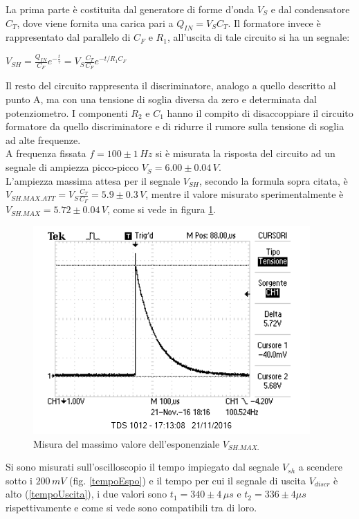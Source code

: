\documentclass[10pt,a4paper]{article}
\begin{document}
La prima parte è costituita dal generatore di forme d'onda $V_S$ e dal condensatore $C_T$, dove viene fornita una carica pari a $Q_{IN}=V_S C_T$. Il formatore invece è rappresentato dal parallelo di $C_F$ e $R_1$, all'uscita di tale circuito si ha un segnale:\\
\begin{center}
$V_{SH}=\frac{Q_{IN}}{C_F} e^{-\frac{t}{\tau}} = V_S \frac{C_T}{C_F} e^{-t/R_1 C_F}$\\
\end{center}

Il resto del circuito rappresenta il discriminatore, analogo a quello descritto al punto A, ma con una tensione di soglia diversa da zero e determinata dal potenziometro. I componenti $R_2$ e $C_1$ hanno il compito di disaccoppiare il circuito formatore da quello discriminatore e di ridurre il rumore sulla tensione di soglia ad alte frequenze.\\
A frequenza fissata $f = 100\pm 1 \, Hz$ si è misurata la risposta del circuito ad un segnale di ampiezza picco-picco $V_S = 6.00 \pm 0.04 \, V$.\\
L'ampiezza massima attesa per il segnale $V_{SH}$, secondo la formula sopra citata, è $V_{SH.MAX.ATT} = V_S \frac{C_T}{C_F} =  5.9 \pm 0.3 \, V$, mentre il valore misurato sperimentalmente è $V_{SH.MAX} = 5.72 \pm 0.04 \, V$, come si vede in figura \ref{esponenziale}.\\

\begin{figure}[h]
\centering
\includegraphics[scale=1.0]{immagini/esponenziale.png}
\caption{Misura del massimo valore dell'esponenziale $V_{SH.MAX.}$}
\label{esponenziale}
\end{figure}

Si sono misurati sull'oscilloscopio il tempo impiegato dal segnale $V_{sh}$ a scendere sotto i  $200 \, mV$ (fig. \ref{tempoEspo}) e il tempo per cui il segnale di uscita $V_{discr}$ è alto (\ref{tempoUscita}), i due valori sono $t_1 = 340 \pm 4 \, \mu s$ e  $t_2 = 336 \pm 4 \mu s$ rispettivamente e come si vede sono compatibili tra di loro.
\end{document}
